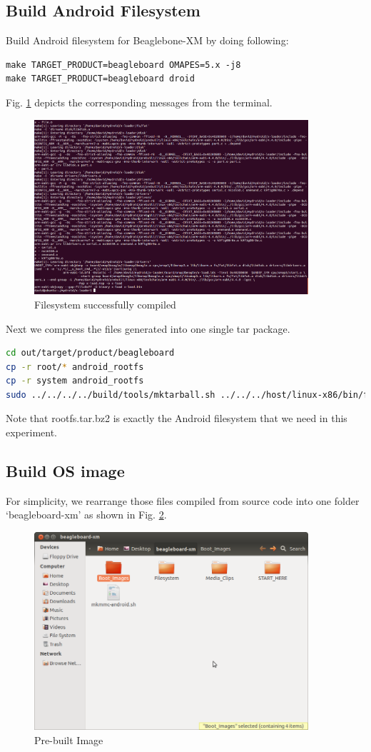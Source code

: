 \documentclass[12pt,journal,draftclsnofoot,onecolumn]{IEEEtran}
\begin{document}
\subsection{Build Android Filesystem}
Build Android filesystem for Beaglebone-XM by doing following:

 \begin{lstlisting}[language={make}]
make TARGET_PRODUCT=beagleboard OMAPES=5.x -j8
make TARGET_PRODUCT=beagleboard droid 
\end{lstlisting}
Fig. \ref{filesystem} depicts the corresponding messages from the terminal.
\begin{figure}[ht]
	\centering
	\includegraphics[width=4in]{./figs/x-loader.png}
	\caption{Filesystem successfully compiled}
	\label{filesystem}
\end{figure}

Next we compress the files generated into one single tar package. 
 \begin{lstlisting}[language={bash}]
cd out/target/product/beagleboard
cp -r root/* android_rootfs
cp -r system android_rootfs
sudo ../../../../build/tools/mktarball.sh ../../../host/linux-x86/bin/fs_get_stats android_rootfs . rootfs rootfs.tar.bz2
\end{lstlisting}
Note that rootfs.tar.bz2 is exactly the Android filesystem that we need in this experiment.

\subsection{Build OS image}
For simplicity, we rearrange those files compiled from source code into one folder `beagleboard-xm' as shown in Fig. \ref{bb-xm}.
\begin{figure}[ht]
	\centering
	\includegraphics[width=4in]{./figs/bb-xm.png}
	\caption{Pre-built Image}
	\label{bb-xm}
\end{figure}
\end{document}
